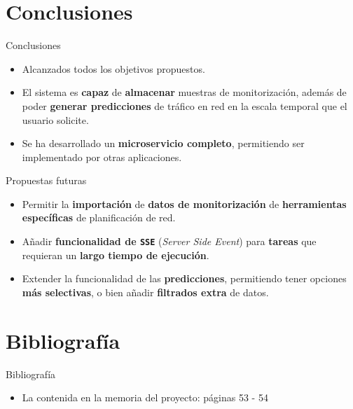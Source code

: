 \documentclass[aspectratio=169,xcolor=dvipsnames]{beamer}
\begin{document}
	
	\section{Conclusiones}
	
	\begin{frame}{Conclusiones}
		\begin{itemize}
			\item Alcanzados todos los objetivos propuestos.
			
			\item El sistema es \textbf{capaz} de \textbf{almacenar} muestras de monitorización, además de poder \textbf{generar predicciones} de tráfico en red en la escala temporal que el usuario solicite.
			
			\item Se ha desarrollado un \textbf{microservicio completo}, permitiendo ser implementado por otras aplicaciones.
		\end{itemize}
	
		\begin{exampleblock}{Propuestas futuras}
			\begin{itemize}
				\item Permitir la \textbf{importación} de \textbf{datos de monitorización} de \textbf{herramientas específicas} de planificación de red.
				
				\item Añadir \textbf{funcionalidad de \texttt{SSE}} (\textit{Server Side Event}) para \textbf{tareas} que requieran un \textbf{largo tiempo de ejecución}.
				
				\item Extender la funcionalidad de las \textbf{predicciones}, permitiendo tener opciones \textbf{más selectivas}, o bien añadir \textbf{filtrados extra} de datos.
			\end{itemize}
		\end{exampleblock}
	\end{frame}
	
	
	\section{Bibliografía}
	
	\begin{frame}{Bibliografía}
		\begin{itemize}
		    \item La contenida en la memoria del proyecto: páginas 53 - 54
		\end{itemize}
	\end{frame}
	
\end{document}
